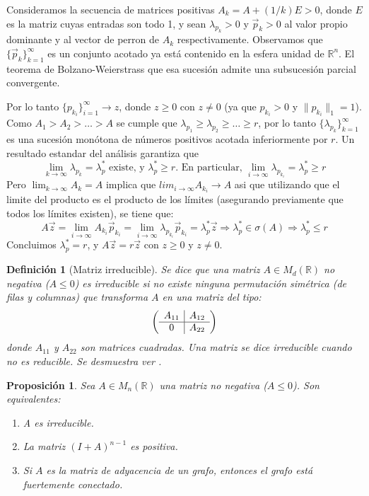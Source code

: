 \documentclass[size=a4, parskip=half, titlepage=false, toc=flat, toc=bib, 12pt]{scrartcl}
\makeatletter
\renewenvironment{proof}[1][\proofname] {\par\pushQED{\qed}\normalfont\topsep6\p@\@plus6\p@\relax\trivlist\item[\hskip\labelsep\itshape\tgpaella#1\@addpunct{.}]\ignorespaces}{\popQED\endtrivlist\@endpefalse}
\theoremstyle{theorem-style}
\newtheorem{nprop}{Proposición}[section]
\theoremstyle{definition-style}
\newtheorem{ndef}{Definición}[section]
\theoremstyle{remark-style}
\theoremstyle{example-style}
\theoremstyle{definition-style}
\theoremstyle{remark-style}
\makeatother
\begin{document}
\begin{proof}
Consideramos la secuencia de matrices positivas $A_k = A + (1/k)E > 0$, donde $E$ es la matriz cuyas entradas son todo 1, y sean $\lambda_{p_k} >0$ y $\vec{p}_k >0$ al valor propio dominante y al vector de perron de $A_k$ respectivamente. Observamos que $\{\vec{p}_k\}_{k=1}^{\infty}$ es un conjunto acotado ya está contenido en la esfera unidad de $\mathbb{R}^n$. El teorema de Bolzano-Weierstrass que esa sucesión admite una subsucesión parcial convergente.

Por lo tanto $\{p_{k_i}\}_{i = 1}^{\infty} \rightarrow z$, donde $z \geq 0$ con $z \neq 0$ (ya que $p_{k_i} > 0$ y $\|p_{k_i} \|_1 = 1$). Como $A_1 > A_2 > \dots > A$ se cumple que $\lambda_{p_1} \geq \lambda_{p_2} \geq \dots \geq r $, por lo tanto $\{\lambda_{p_k}\}_{k = 1}^{\infty}$ es una sucesión monótona de números positivos acotada inferiormente por $r$. Un resultado estandar del análisis garantiza que
$$\lim_{k \to \infty} \lambda_{p_k} = \lambda_p^* \textrm{ existe, y } \lambda_p^* \geq r \textrm{. En particular, } \lim_{i \to \infty} \lambda_{p_{k_i}} = \lambda_p^* \geq r$$
Pero $\lim_{k \to \infty} A_k = A$ implica que $lim_{i \to \infty} A_{k_i} \rightarrow A$ asi que utilizando que el limite del producto es el producto de los límites (asegurando previamente que todos los límites existen), se tiene que:
$$A \vec{z} = \lim_{i \to \infty} A_{k_i} \vec{p}_k_i = \lim_{i \to \infty} \lambda_{p_{k_i}} \vec{p}_{k_i} = \lambda_p^* \vec{z}  \Rightarrow \lambda_p^* \in \sigma(A) \Rightarrow \lambda_p^* \leq r$$
Concluimos $\lambda_p^* = r$, y $A \vec{z} = r \vec{z}$ con $z \geq 0$ y $z \neq 0$.
\end{proof}

\begin{ndef}[Matriz irreducible]
Se dice que una matriz $A \in M_d(\mathbb{R})$ no negativa ($A \leq 0$) es irreducible si no existe ninguna permutación simétrica (de filas y columnas) que transforma $A$ en una matriz del tipo:
$$\left(
      \begin{array}{{c|c}}
            A_{11}    &    A_{12}  \\\hline
            0         &    A_{22}     \\
      \end{array}   \right)$$
donde $A_{11}$ y $A_{22}$ son matrices cuadradas. Una matriz se dice irreducible cuando no es reducible. Se desmuestra ver \cite{algebralineal}.
\end{ndef}

\begin{nprop}
\label{irreducible}
\label{positiva}
Sea $A \in M_n(\mathbb{R})$ una matriz no negativa ($A \leq 0$). Son equivalentes:
\begin{enumerate}
\item A es irreducible.
\item La matriz $(I + A)^{n - 1}$ es positiva.
\item Si $A$ es la matriz de adyacencia de un grafo, entonces el grafo está fuertemente conectado.
\end{enumerate}
\end{nprop}
\end{document}
